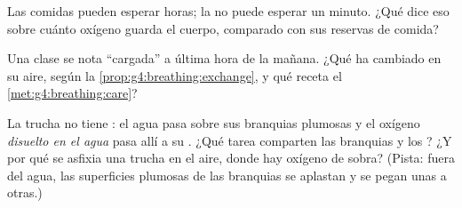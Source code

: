\begin{exercise}[$\star\star$]\label{exo:g4:breathing:9}
Las comidas pueden esperar horas; la  no puede esperar un
minuto. ¿Qué dice eso sobre cuánto oxígeno guarda el cuerpo, comparado
con sus reservas de comida?
\end{exercise}

\begin{exercise}[$\star\star$]\label{exo:g4:breathing:10}
Una clase se nota ``cargada'' a última hora de la mañana. ¿Qué ha
cambiado en su aire, según la \cref{prop:g4:breathing:exchange}, y qué
receta el \cref{met:g4:breathing:care}?
\end{exercise}

\begin{exercise}[$\star\star\star$]\label{exo:g4:breathing:11}
La trucha no tiene : el agua pasa sobre sus branquias plumosas
y el oxígeno \emph{disuelto en el agua} pasa allí a su . ¿Qué
tarea comparten las branquias y los ? ¿Y por qué se asfixia
una trucha en el aire, donde hay oxígeno de sobra? (Pista: fuera del
agua, las superficies plumosas de las branquias se aplastan y se pegan
unas a otras.)
\end{exercise}
